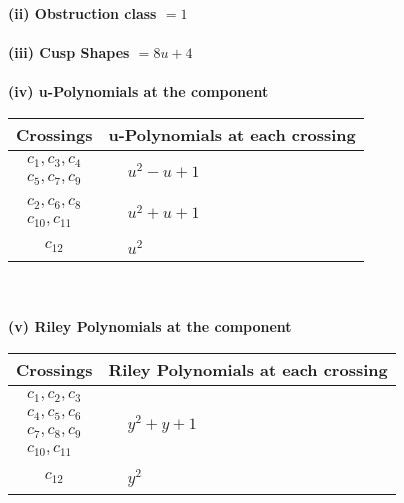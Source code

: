 \documentclass[1p]{elsarticle_modified}
\theoremstyle{definition}
\begin{document}
\flushleft \textbf{(ii) Obstruction class $= 1$}\\~\\
\flushleft \textbf{(iii) Cusp Shapes $= 8 u+4$}\\~\\
\newpage\renewcommand{\arraystretch}{1}
\flushleft \textbf{(iv) u-Polynomials at the component}\newline \\
\begin{tabular}{m{50pt}|m{274pt}}
Crossings & \hspace{64pt}u-Polynomials at each crossing \\
\hline $$\begin{aligned}c_{1},c_{3},c_{4}\\c_{5},c_{7},c_{9}\end{aligned}$$&$\begin{aligned}
&u^2- u+1
\end{aligned}$\\
\hline $$\begin{aligned}c_{2},c_{6},c_{8}\\c_{10},c_{11}\end{aligned}$$&$\begin{aligned}
&u^2+u+1
\end{aligned}$\\
\hline $$\begin{aligned}c_{12}\end{aligned}$$&$\begin{aligned}
&u^2
\end{aligned}$\\
\hline
\end{tabular}\\~\\
\newpage\renewcommand{\arraystretch}{1}
\flushleft \textbf{(v) Riley Polynomials at the component}\newline \\
\begin{tabular}{m{50pt}|m{274pt}}
Crossings & \hspace{64pt}Riley Polynomials at each crossing \\
\hline $$\begin{aligned}c_{1},c_{2},c_{3}\\c_{4},c_{5},c_{6}\\c_{7},c_{8},c_{9}\\c_{10},c_{11}\end{aligned}$$&$\begin{aligned}
&y^2+y+1
\end{aligned}$\\
\hline $$\begin{aligned}c_{12}\end{aligned}$$&$\begin{aligned}
&y^2
\end{aligned}$\\
\hline
\end{tabular}\\~\\
\end{document}
